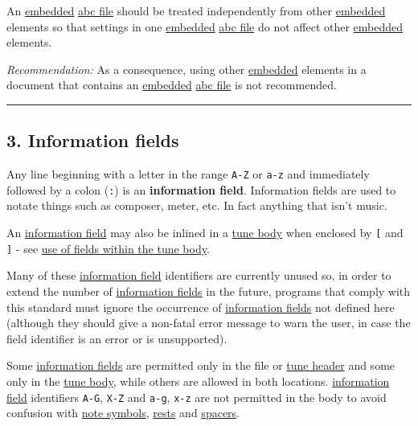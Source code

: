 \documentclass[oneside]{book}
\begin{document}
An \protect\hyperlink{embedded_definition}{embedded}
\protect\hyperlink{abc_file_definition}{abc file} should be treated
independently from other
\protect\hyperlink{embedded_definition}{embedded} elements so that
settings in one \protect\hyperlink{embedded_definition}{embedded}
\protect\hyperlink{abc_file_definition}{abc file} do not affect other
\protect\hyperlink{embedded_definition}{embedded} elements.

\emph{Recommendation:} As a consequence, using other
\protect\hyperlink{embedded_definition}{embedded} elements in a document
that contains an \protect\hyperlink{embedded_definition}{embedded}
\protect\hyperlink{abc_file_definition}{abc file} is not recommended.

\begin{center}\rule{0.5\linewidth}{\linethickness}\end{center}

\hypertarget{information_fields}{\subsection{3. Information
fields}\label{information_fields}}

\href{}{}Any line beginning with a letter in the range \texttt{A-Z} or
\texttt{a-z} and immediately followed by a colon (\texttt{:}) is an
\textbf{information field}. Information fields are used to notate things
such as composer, meter, etc. In fact anything that isn't music.

An \protect\hyperlink{information_field_definition}{information field}
may also be inlined in a \protect\hyperlink{tune_body_definition}{tune
body} when enclosed by \texttt{{[}} and \texttt{{]}} - see
\protect\hyperlink{use_of_fields_within_the_tune_body}{use of fields
within the tune body}.

Many of these
\protect\hyperlink{information_field_definition}{information field}
identifiers are currently unused so, in order to extend the number of
\protect\hyperlink{information_field_definition}{information fields} in
the future, programs that comply with this standard must ignore the
occurrence of
\protect\hyperlink{information_field_definition}{information fields} not
defined here (although they should give a non-fatal error message to
warn the user, in case the field identifier is an error or is
unsupported).

Some \protect\hyperlink{information_field_definition}{information
fields} are permitted only in the file or
\protect\hyperlink{tune_header_definition}{tune header} and some only in
the \protect\hyperlink{tune_body_definition}{tune body}, while others
are allowed in both locations.
\protect\hyperlink{information_field_definition}{information field}
identifiers \texttt{A-G}, \texttt{X-Z} and \texttt{a-g}, \texttt{x-z}
are not permitted in the body to avoid confusion with
\protect\hyperlink{pitch}{note symbols},
\protect\hyperlink{rests}{rests} and
\protect\hyperlink{typesetting_extra_space}{spacers}.
\end{document}
